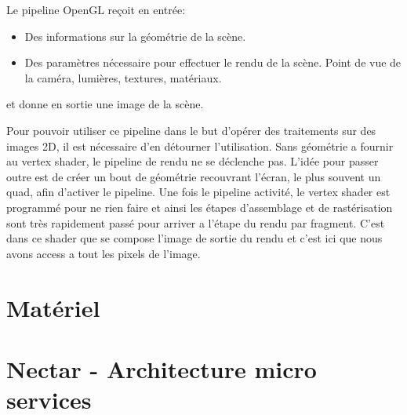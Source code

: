 
Le pipeline OpenGL reçoit en entrée:
\begin{itemize}
\item Des informations sur la géométrie de la scène.
\item Des paramètres nécessaire pour effectuer le rendu de la scène. Point de vue de la caméra, lumières, textures, matériaux.
\end{itemize}
et donne en sortie une image de la scène.

Pour pouvoir utiliser ce pipeline dans le but d'opérer des traitements sur des images 2D, il est nécessaire d'en détourner l'utilisation. Sans géométrie a fournir au vertex shader, le pipeline de rendu ne se déclenche pas. L'idée pour passer outre est de créer un bout de géométrie recouvrant l'écran, le plus souvent un quad, afin d'activer le pipeline. Une fois le pipeline activité, le vertex shader est programmé pour ne rien faire  et ainsi les étapes d'assemblage et de rastérisation sont très rapidement passé pour arriver a l'étape du rendu par fragment. C'est dans ce shader que se compose l'image de sortie du rendu et c'est ici que nous avons access a tout les pixels de l'image.



\section{Matériel}

\section{Nectar - Architecture micro services}
